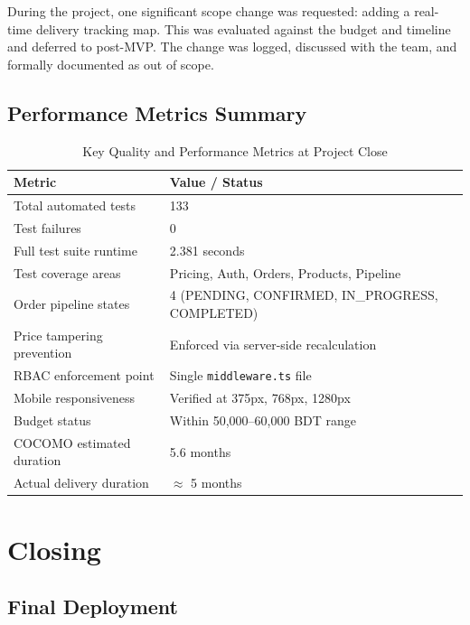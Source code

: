 \documentclass[12pt,a4paper]{report}
\begin{document}
During the project, one significant scope change was requested: adding a real-time delivery tracking map. This was evaluated against the budget and timeline and deferred to post-MVP. The change was logged, discussed with the team, and formally documented as out of scope.

\section{Performance Metrics Summary}

\begin{table}[H]
  \centering
  \caption{Key Quality and Performance Metrics at Project Close}
  \begin{tabularx}{\textwidth}{L{5cm} X}
    \toprule
    \textbf{Metric} & \textbf{Value / Status} \\
    \midrule
    Total automated tests        & 133 \\
    Test failures                & 0 \\
    Full test suite runtime      & 2.381 seconds \\
    Test coverage areas          & Pricing, Auth, Orders, Products, Pipeline \\
    Order pipeline states        & 4 (PENDING, CONFIRMED, IN\_PROGRESS, COMPLETED) \\
    Price tampering prevention   & Enforced via server-side recalculation \\
    RBAC enforcement point       & Single \texttt{middleware.ts} file \\
    Mobile responsiveness        & Verified at 375px, 768px, 1280px \\
    Budget status                & Within 50,000--60,000 BDT range \\
    COCOMO estimated duration    & 5.6 months \\
    Actual delivery duration     & $\approx$ 5 months \\
    \bottomrule
  \end{tabularx}
\end{table}

\chapter{Closing}

\section{Final Deployment}
\end{document}
